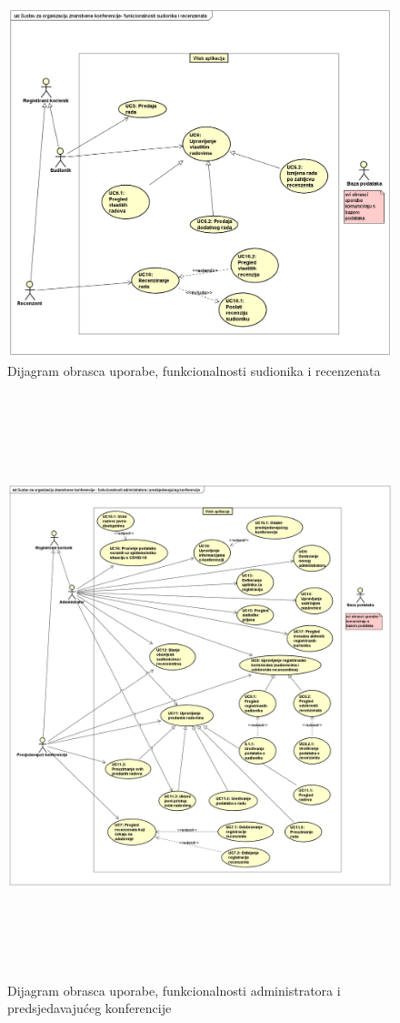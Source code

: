 					\begin{figure}[H]
						\includegraphics[scale=0.35]{dijagrami/funkcionalnosti-sudionici-recenzenti.png} 
						\centering
						\caption{Dijagram obrasca uporabe, funkcionalnosti sudionika i recenzenata}
						\label{fig:dijagramobrascauporabe2}
					\end{figure}
						\begin{figure}[H]
						\includegraphics[height=17cm,width=15cm]{dijagrami/funkcionalnosti-administrator-predsjedavajucikonferencije.png} 
						\centering
						\caption{Dijagram obrasca uporabe, funkcionalnosti administratora i predsjedavajućeg konferencije}
						\label{fig:dijagramobrascauporabe3}
					\end{figure}

